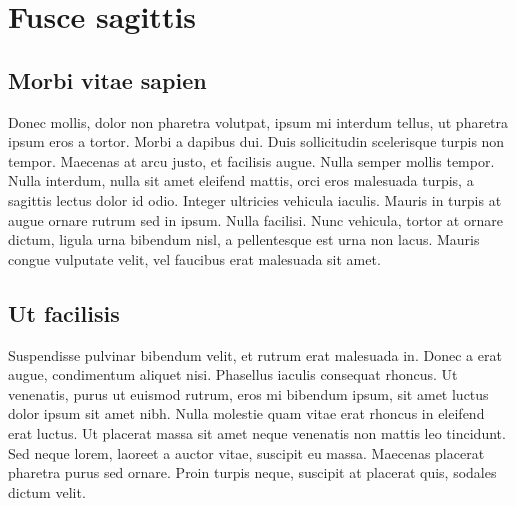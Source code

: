 \chapter{Fusce sagittis}
\section{Morbi vitae sapien}

Donec mollis, dolor non pharetra volutpat, ipsum mi interdum tellus, ut pharetra ipsum eros a tortor. Morbi a dapibus dui. Duis sollicitudin scelerisque turpis non tempor. Maecenas at arcu justo, et facilisis augue. Nulla semper mollis tempor. Nulla interdum, nulla sit amet eleifend mattis, orci eros malesuada turpis, a sagittis lectus dolor id odio. Integer ultricies vehicula iaculis. Mauris in turpis at augue ornare rutrum sed in ipsum. Nulla facilisi. Nunc vehicula, tortor at ornare dictum, ligula urna bibendum nisl, a pellentesque est urna non lacus. Mauris congue vulputate velit, vel faucibus erat malesuada sit amet. 

\section{Ut facilisis}

Suspendisse pulvinar bibendum velit, et rutrum erat malesuada in. Donec a erat augue, condimentum aliquet nisi. Phasellus iaculis consequat rhoncus. Ut venenatis, purus ut euismod rutrum, eros mi bibendum ipsum, sit amet luctus dolor ipsum sit amet nibh. Nulla molestie quam vitae erat rhoncus in eleifend erat luctus. Ut placerat massa sit amet neque venenatis non mattis leo tincidunt. Sed neque lorem, laoreet a auctor vitae, suscipit eu massa. Maecenas placerat pharetra purus sed ornare. Proin turpis neque, suscipit at placerat quis, sodales dictum velit. 
